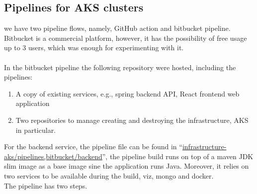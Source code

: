\subsection{Pipelines for AKS clusters}\label{subsec:Pipelines:AKSCluster}
we have two pipeline flows, namely, GitHub action and bitbucket pipeline.\\
Bitbucket is a commercial platform, however, it has the possibility of free usage up to 3 users, which was enough for experimenting with it.
\\\\
In the bitbucket pipeline the following repository were hosted, including the pipelines:
\begin{enumerate}
    \item A copy of existing services, e.g., spring backend API, React frontend web application
    \item Two repositories to manage creating and destroying the infrastructure, AKS in particular.
\end{enumerate}
For the backend service, the pipeline file can be found in “\url{infrastructure-aks/pipelines,bitbucket/backend}”, the pipeline build runs on top of a maven JDK slim image as a base image sine the application runs Java. Moreover, it relies on two services to be available during the build, viz, mongo and docker.
\\
The pipeline has two steps.
